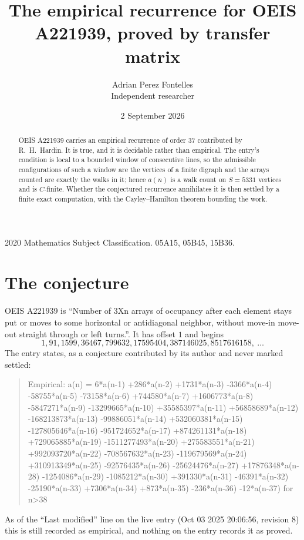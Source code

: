 \documentclass[11pt,a4paper]{article}
\title{The empirical recurrence for OEIS A221939, proved by transfer matrix}
\author{Adrian Perez Fontelles\\ \small Independent researcher}
\date{2 September 2026}
\theoremstyle{plain}
\theoremstyle{definition}
\begin{document}
\maketitle

\begin{abstract}
OEIS A221939 carries an empirical recurrence of order $37$ contributed by R.~H.~Hardin. It is
true, and it is decidable rather than empirical. The entry's condition is local to a bounded window of consecutive lines, so
the admissible configurations of such a window are the vertices of a finite digraph and the
arrays counted are exactly the walks in it; hence $a(n)$ is a walk count on $S=5331$ vertices
and is $C$-finite. Whether the conjectured recurrence annihilates it is then settled by a
finite exact computation, with the Cayley--Hamilton theorem bounding the work.
\end{abstract}

\noindent\small 2020 Mathematics Subject Classification. 05A15, 05B45, 15B36.\normalsize

\section{The conjecture}

OEIS A221939 is ``Number of 3Xn arrays of occupancy after each element stays put or moves to some horizontal or antidiagonal neighbor, without move-in move-out straight through or left turns.''. It has offset $1$ and begins
\[
1, 91, 1599, 36467, 799632, 17595404, 387146025, 8517616158,\ \dots
\]
The entry states, as a conjecture contributed by its author and never marked settled:
\begin{quote}
Empirical: a(n) = 6*a(n-1) +286*a(n-2) +1731*a(n-3) -3366*a(n-4) -58755*a(n-5) -73158*a(n-6) +744580*a(n-7) +1606773*a(n-8) -5847271*a(n-9) -13299665*a(n-10) +35585397*a(n-11) +56858689*a(n-12) -168213873*a(n-13) -99886051*a(n-14) +532060381*a(n-15) -127805646*a(n-16) -951724652*a(n-17) +874261131*a(n-18) +729065885*a(n-19) -1511277493*a(n-20) +275583551*a(n-21) +992093720*a(n-22) -708567632*a(n-23) -119679569*a(n-24) +310913349*a(n-25) -92576435*a(n-26) -25624476*a(n-27) +17876348*a(n-28) -1254086*a(n-29) -1085212*a(n-30) +391330*a(n-31) -46391*a(n-32) -25190*a(n-33) +7306*a(n-34) +873*a(n-35) -236*a(n-36) -12*a(n-37) for n>38
\end{quote}
As of the ``Last modified'' line on the live entry (Oct 03 2025 20:06:56, revision 8) this is still
recorded as empirical, and nothing on the entry records it as proved.
\end{document}
